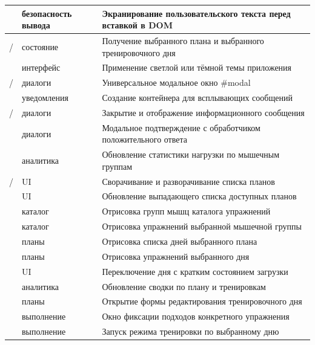 \begin{xltabular}{\textwidth}{|P{4.4cm}|P{3.4cm}|X|}
	 & безопасность вывода & Экранирование пользовательского текста перед вставкой в DOM \\ \hline
	 /  & состояние & Получение выбранного плана и выбранного тренировочного дня \\ \hline
	 & интерфейс & Применение светлой или тёмной темы приложения \\ \hline
	 /  & диалоги & Универсальное модальное окно \#modal \\ \hline
	 & уведомления & Создание контейнера для всплывающих сообщений \\ \hline
	 /  & диалоги & Закрытие и отображение информационного сообщения \\ \hline
	 & диалоги & Модальное подтверждение с обработчиком положительного ответа \\ \hline
	 & аналитика & Обновление статистики нагрузки по мышечным группам \\ \hline
	 /  & UI & Сворачивание и разворачивание списка планов \\ \hline
	 & UI & Обновление выпадающего списка доступных планов \\ \hline
	 & каталог & Отрисовка групп мышц каталога упражнений \\ \hline
	 & каталог & Отрисовка упражнений выбранной мышечной группы \\ \hline
	 & планы & Отрисовка списка дней выбранного плана \\ \hline
	 & планы & Отрисовка упражнений выбранного дня \\ \hline
	 & UI & Переключение дня с кратким состоянием загрузки \\ \hline
	 & аналитика & Обновление сводки по плану и тренировкам \\ \hline
	 & планы & Открытие формы редактирования тренировочного дня \\ \hline
	 & выполнение & Окно фиксации подходов конкретного упражнения \\ \hline
	 & выполнение & Запуск режима тренировки по выбранному дню \\ \hline

\end{xltabular}
